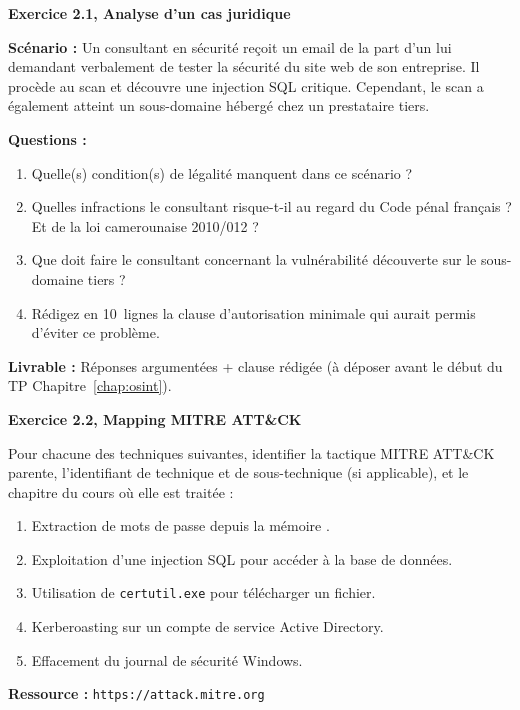 \begin{boxexo}
\textbf{Exercice 2.1, Analyse d'un cas juridique}

\medskip
\textbf{Scénario :} Un consultant en sécurité reçoit un email de la part d'un
 lui demandant verbalement de tester la sécurité du site web de son
entreprise. Il procède au scan et découvre une injection SQL critique.
Cependant, le scan a également atteint un sous-domaine hébergé chez un
prestataire tiers.

\medskip
\textbf{Questions :}
\begin{enumerate}
    \item Quelle(s) condition(s) de légalité manquent dans ce scénario ?
    \item Quelles infractions le consultant risque-t-il au regard du Code pénal
          français ? Et de la loi camerounaise 2010/012 ?
    \item Que doit faire le consultant concernant la vulnérabilité découverte
          sur le sous-domaine tiers ?
    \item Rédigez en 10~lignes la clause d'autorisation minimale qui aurait
          permis d'éviter ce problème.
\end{enumerate}

\medskip
\textbf{Livrable :} Réponses argumentées + clause rédigée (à déposer
avant le début du TP Chapitre~\ref{chap:osint}).
\end{boxexo}

\begin{boxexo}
\textbf{Exercice 2.2, Mapping MITRE ATT\&CK}

\medskip
Pour chacune des techniques suivantes, identifier la tactique MITRE ATT\&CK
parente, l'identifiant de technique et de sous-technique (si applicable), et
le chapitre du cours où elle est traitée :
\begin{enumerate}
    \item Extraction de mots de passe depuis la mémoire .
    \item Exploitation d'une injection SQL pour accéder à la base de données.
    \item Utilisation de \texttt{certutil.exe} pour télécharger un fichier.
    \item Kerberoasting sur un compte de service Active Directory.
    \item Effacement du journal de sécurité Windows.
\end{enumerate}

\medskip
\textbf{Ressource :} \texttt{https://attack.mitre.org}
\end{boxexo}
